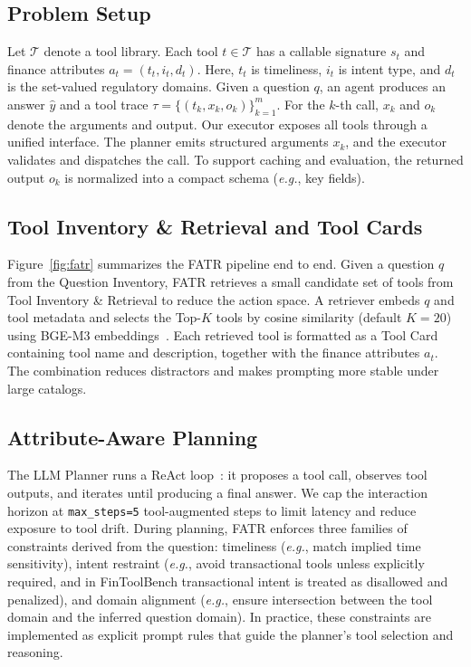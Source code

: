 \documentclass[sigconf,nonacm]{acmart}
\begin{document}
\subsection{Problem Setup}
Let $\mathcal{T}$ denote a tool library.
Each tool $t \in \mathcal{T}$ has a callable signature $s_t$ and finance attributes $a_t=(t_t,i_t,d_t)$.
Here, $t_t$ is timeliness, $i_t$ is intent type, and $d_t$ is the set-valued regulatory domains.
Given a question $q$, an agent produces an answer $\hat{y}$ and a tool trace $\tau=\{(t_k,x_k,o_k)\}_{k=1}^{m}$.
For the $k$-th call, $x_k$ and $o_k$ denote the arguments and output.
Our executor exposes all tools through a unified interface.
The planner emits structured arguments $x_k$, and the executor validates and dispatches the call.
To support caching and evaluation, the returned output $o_k$ is normalized into a compact schema (\textit{e.g.}, key fields).

\subsection{Tool Inventory \& Retrieval and Tool Cards}
Figure~\ref{fig:fatr} summarizes the FATR pipeline end to end.
Given a question $q$ from the Question Inventory, FATR retrieves a small candidate set of tools from Tool Inventory \& Retrieval to reduce the action space.
A retriever embeds $q$ and tool metadata and selects the Top-$K$ tools by cosine similarity (default $K{=}20$) using BGE-M3 embeddings~\cite{chen2024bge}.
Each retrieved tool is formatted as a Tool Card containing tool name and description, together with the finance attributes $a_t$.
The combination reduces distractors and makes prompting more stable under large catalogs.





\subsection{Attribute-Aware Planning}
The LLM Planner runs a ReAct loop~\cite{yao2022react}: it proposes a tool call, observes tool outputs, and iterates until producing a final answer.
We cap the interaction horizon at \texttt{max\_steps{=}5} tool-augmented steps to limit latency and reduce exposure to tool drift.
During planning, FATR enforces three families of constraints derived from the question: timeliness (\textit{e.g.}, match implied time sensitivity), intent restraint (\textit{e.g.}, avoid transactional tools unless explicitly required, and in FinToolBench transactional intent is treated as disallowed and penalized), and domain alignment (\textit{e.g.}, ensure intersection between the tool domain and the inferred question domain).
In practice, these constraints are implemented as explicit prompt rules that guide the planner’s tool selection and reasoning.
\end{document}
